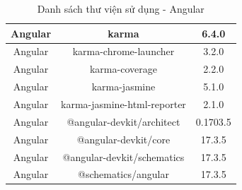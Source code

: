 \documentclass[../DoAn.tex]{subfiles}
\begin{document}
\begin{table}[H]
\begin{tabular}{|c|c|c|}
        \hline
        Angular & karma & 6.4.0 \\
        \hline
        Angular & karma-chrome-launcher & 3.2.0 \\
        \hline
        Angular & karma-coverage & 2.2.0 \\
        \hline
        Angular & karma-jasmine & 5.1.0 \\
        \hline
        Angular & karma-jasmine-html-reporter & 2.1.0 \\
        \hline
        Angular & @angular-devkit/architect & 0.1703.5 \\
        \hline
        Angular & @angular-devkit/core & 17.3.5 \\
        \hline
        Angular & @angular-devkit/schematics & 17.3.5 \\
        \hline
        Angular & @schematics/angular & 17.3.5 \\
        \hline
        \end{tabular}
        \caption{Danh sách thư viện sử dụng - Angular}
        \label{table:libraries_used_angular}
    \end{table}
\end{document}
